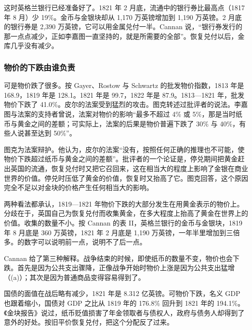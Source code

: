 这时英格兰银行已经准备好了。1821 年 2 月底，流通中的银行券比最高点（1817 年 8 月）少 19\%。金币与金银块却从 1,170 万英镑增加到 1,190 万英镑。2 月底的银行券是 2,390 万英镑，它可以用金属兑付一半\cite{cannan1919}。Cannan 说，“银行券发行的那一点点减少，正如李嘉图一直坚持的，就是所需要的全部”\cite{cannan1919}。恢复兑付以后，金库几乎没有减少\cite{cannan1919}。

\subsubsection{物价的下跌由谁负责}
可是物价跌了很多。按 Gayer、Rostow 与 Schwartz 的批发物价指数，1813 年是 168.9，1819 年是 128.1。1821 年是 99.7，1822 年是 87.9\cite{gayer1953,boe2017}。1813—1821 年，批发物价下跌了 41.0\%。皮尔的法案受到猛烈的攻击。图克转述过批评者的说法。李嘉图与法案的支持者曾说，法案对物价的影响“最多不超过 4\% 或 5\%，那是当时纸币与黄金之间的差额；可实际上，法案的后果是物价普遍下跌了 30\% 与 40\%，有些人说甚至达到 50\%”\cite{tooke1838}。

图克为法案辩护。他认为，皮尔的法案“没有，按照任何正确的推理也不可能，使物价下跌超过纸币与黄金之间的差额”\cite{tooke1838}。批评者的一个论证是，停兑期间把黄金赶出英国的流通，恢复兑付时又把它召回来，这在相当大的程度上影响了金银在商业世界的价值。停兑时压低了黄金的价值，恢复时又抬高了它\cite{tooke1838}。图克回答，这个原因完全不足以对金块的价格产生任何相当大的影响\cite{tooke1838}。

两种看法都承认，1819—1821 年物价下跌的大部分发生在用黄金表示的物价上。分歧在于，英国自己为恢复兑付而收集黄金，在多大程度上抬高了黄金在世界上的价值。收集的数量不小。按 Cannan 的表 II，英格兰银行的金币与金银块，1819 年 8 月底是 360 万英镑，1821 年 2 月底是 1,190 万英镑，一年半里增加到三倍多\cite{cannan1919}。的数字可以说明前一点，说明不了后一点。

Cannan 给了第三种解释。战争结束的时候，即使纸币的数量不变，物价也会下跌。首先是因为公共支出骤降，正像战争开始时物价上涨是因为公共支出猛增（(a)）；其次是因为普通商品变得容易得到了\cite{cannan1919}。

国债的面值在战后略有减少，1821 年是 8.312 亿英镑。可物价下跌，名义 GDP 也跟着缩小，国债对 GDP 之比从 1819 年的 176.8\% 回升到 1821 年的 194.1\%\cite{boe2017,mitchell1988}。《金块报告》说过，纸币贬值损害了年金领取者与债权人，政府与债务人却得到了意外的好处。按旧平价恢复兑付，把这个分配反了过来。

